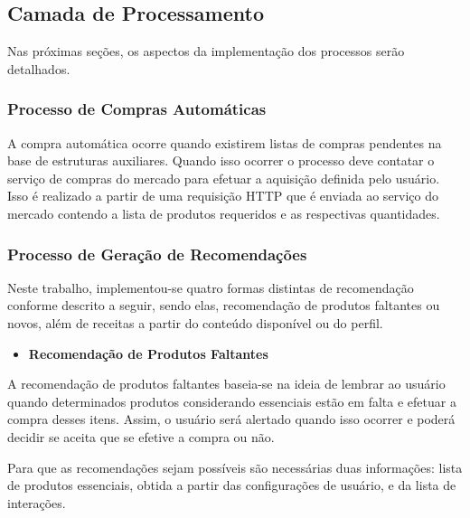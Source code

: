 
\subsection{Camada de Processamento}

Nas próximas seções, os aspectos da implementação dos processos serão detalhados.

\ProximoForaDoSumario 
\subsubsection{Processo de Compras Automáticas}

A compra automática ocorre quando existirem listas de compras pendentes na base de estruturas auxiliares. Quando isso ocorrer o processo deve contatar o serviço de compras do mercado para efetuar a aquisição definida pelo usuário. Isso é realizado a partir de uma requisição HTTP que é enviada ao serviço do mercado contendo a lista de produtos requeridos e as respectivas quantidades.

\ProximoForaDoSumario 
\subsubsection{Processo de Geração de Recomendações} \label{sssec:proc_ger_rec}

Neste trabalho, implementou-se quatro formas distintas de recomendação conforme descrito a seguir, sendo elas, recomendação de produtos faltantes ou novos, além de receitas a partir do conteúdo disponível ou do perfil.

\begin{itemize}
    \item \textbf{Recomendação de Produtos Faltantes}
\end{itemize}

A recomendação de produtos faltantes baseia-se na ideia de lembrar ao usuário quando determinados produtos considerando essenciais estão em falta e efetuar a compra desses itens. Assim, o usuário será alertado quando isso ocorrer e poderá decidir se aceita que se efetive a compra ou não.

Para que as recomendações sejam possíveis são necessárias duas informações: lista de produtos essenciais, obtida a partir das configurações de usuário, e da lista de interações. 

